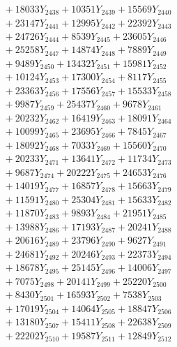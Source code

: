 \documentclass[a4paper,10pt]{article}
\begin{document}
{\begin{align}
&\;  + 18033 Y_{2438} + 10351 Y_{2439} + 15569 Y_{2440} \\[0.3ex]
&\;  + 23147 Y_{2441} + 12995 Y_{2442} + 22392 Y_{2443} \\[0.3ex]
&\;  + 24726 Y_{2444} + 8539 Y_{2445} + 23605 Y_{2446} \\[0.3ex]
&\;  + 25258 Y_{2447} + 14874 Y_{2448} + 7889 Y_{2449} \\[0.3ex]
&\;  + 9489 Y_{2450} + 13432 Y_{2451} + 15981 Y_{2452} \\[0.3ex]
&\;  + 10124 Y_{2453} + 17300 Y_{2454} + 8117 Y_{2455} \\[0.3ex]
&\;  + 23363 Y_{2456} + 17556 Y_{2457} + 15533 Y_{2458} \\[0.5ex]\allowbreak
&\;  + 9987 Y_{2459} + 25437 Y_{2460} + 9678 Y_{2461} \\[0.3ex]
&\;  + 20232 Y_{2462} + 16419 Y_{2463} + 18091 Y_{2464} \\[0.3ex]
&\;  + 10099 Y_{2465} + 23695 Y_{2466} + 7845 Y_{2467} \\[0.3ex]
&\;  + 18092 Y_{2468} + 7033 Y_{2469} + 15560 Y_{2470} \\[0.3ex]
&\;  + 20233 Y_{2471} + 13641 Y_{2472} + 11734 Y_{2473} \\[0.3ex]
&\;  + 9687 Y_{2474} + 20222 Y_{2475} + 24653 Y_{2476} \\[0.3ex]
&\;  + 14019 Y_{2477} + 16857 Y_{2478} + 15663 Y_{2479} \\[0.3ex]
&\;  + 11591 Y_{2480} + 25304 Y_{2481} + 15633 Y_{2482} \\[0.3ex]
&\;  + 11870 Y_{2483} + 9893 Y_{2484} + 21951 Y_{2485} \\[0.3ex]
&\;  + 13988 Y_{2486} + 17193 Y_{2487} + 20241 Y_{2488} \\[0.5ex]\allowbreak
&\;  + 20616 Y_{2489} + 23796 Y_{2490} + 9627 Y_{2491} \\[0.3ex]
&\;  + 24681 Y_{2492} + 20246 Y_{2493} + 22373 Y_{2494} \\[0.3ex]
&\;  + 18678 Y_{2495} + 25145 Y_{2496} + 14006 Y_{2497} \\[0.3ex]
&\;  + 7075 Y_{2498} + 20141 Y_{2499} + 25220 Y_{2500} \\[0.3ex]
&\;  + 8430 Y_{2501} + 16593 Y_{2502} + 7538 Y_{2503} \\[0.3ex]
&\;  + 17019 Y_{2504} + 14064 Y_{2505} + 18847 Y_{2506} \\[0.3ex]
&\;  + 13180 Y_{2507} + 15411 Y_{2508} + 22638 Y_{2509} \\[0.3ex]
&\;  + 22202 Y_{2510} + 19587 Y_{2511} + 12849 Y_{2512} \\[0.3ex]

\end{align}}
\end{document}
